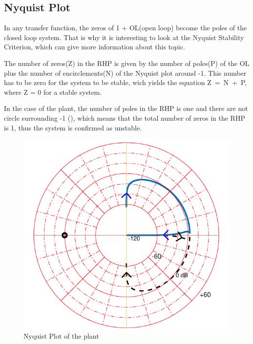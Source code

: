 \subsection{Nyquist Plot}
In any transfer function, the zeros of 1 + OL(open loop) become the poles of the closed loop system. That is why it is interesting to look at the Nyquist Stability Criterion, which can give more information about this topic.

The number of zeros(Z) in the RHP is given by the number of poles(P) of the OL plus the number of encirclements(N) of the Nyquist plot around -1. This number has to be zero for the system to be stable, wich yields the equation \si{Z = N+P}, where Z = 0 for a stable system.

In the case of the plant, the number of poles in the RHP is one and there are not circle surrounding -1 (), which means that the total number of zeros in the RHP is 1, thus the system is confirmed as unstable.

\begin{figure}[H] 
	\centering 
	\includegraphics[scale=0.4]{figures/nyquistCubli}
	\centering
	\captionsetup{justification=centering}	
	\caption{Nyquist Plot of the plant}
	\label{nyquistCubli}
\end{figure}
